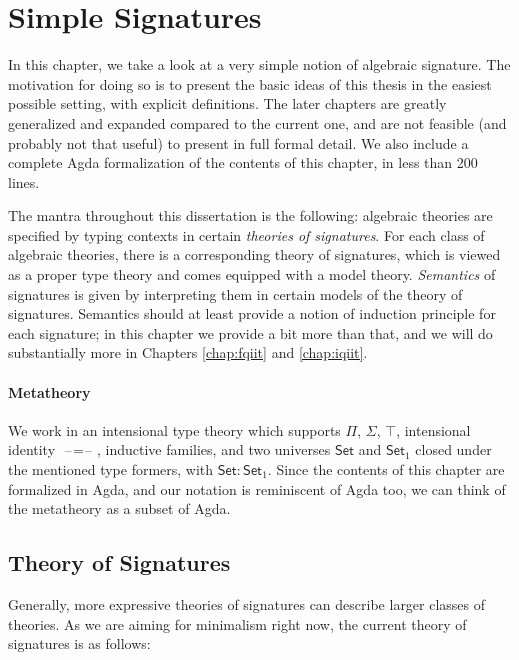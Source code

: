 \documentclass[12pt,a4paper,twoside,openany]{book}
\theoremstyle{remark}
\theoremstyle{definition}
\theoremstyle{theorem}
\newcommand{\blank}{\mathord{\hspace{1pt}\text{--}\hspace{1pt}}}
\newcommand{\Set}{\mathsf{Set}}
\begin{document}
\chapter{Simple Signatures}
\label{chap:simple-inductive-signatures}

In this chapter, we take a look at a very simple notion of algebraic
signature. The motivation for doing so is to present the basic ideas of this
thesis in the easiest possible setting, with explicit definitions. The later
chapters are greatly generalized and expanded compared to the current one, and
are not feasible (and probably not that useful) to present in full formal
detail. We also include a complete Agda formalization of the contents of this
chapter, in less than 200 lines.

The mantra throughout this dissertation is the following: algebraic theories are
specified by typing contexts in certain \emph{theories of signatures}. For each
class of algebraic theories, there is a corresponding theory of signatures,
which is viewed as a proper type theory and comes equipped with a model
theory. \emph{Semantics} of signatures is given by interpreting them in certain
models of the theory of signatures. Semantics should at least provide a notion
of induction principle for each signature; in this chapter we provide a bit more
than that, and we will do substantially more in Chapters \ref{chap:fqiit} and
\ref{chap:iqiit}.

\subsubsection{Metatheory}

We work in an intensional type theory which supports $\Pi$, $\Sigma$, $\top$,
intensional identity $\blank\!=\!\blank$, inductive families, and two universes
$\Set$ and $\Set_1$ closed under the mentioned type formers, with $\Set :
\Set_1$.  Since the contents of this chapter are formalized in Agda, and our
notation is reminiscent of Agda too, we can think of the metatheory as a
subset of Agda.

\section{Theory of Signatures}
\label{sec:simple-signatures}

Generally, more expressive theories of signatures can describe larger classes of
theories. As we are aiming for minimalism right now, the current theory of
signatures is as follows:
\end{document}
